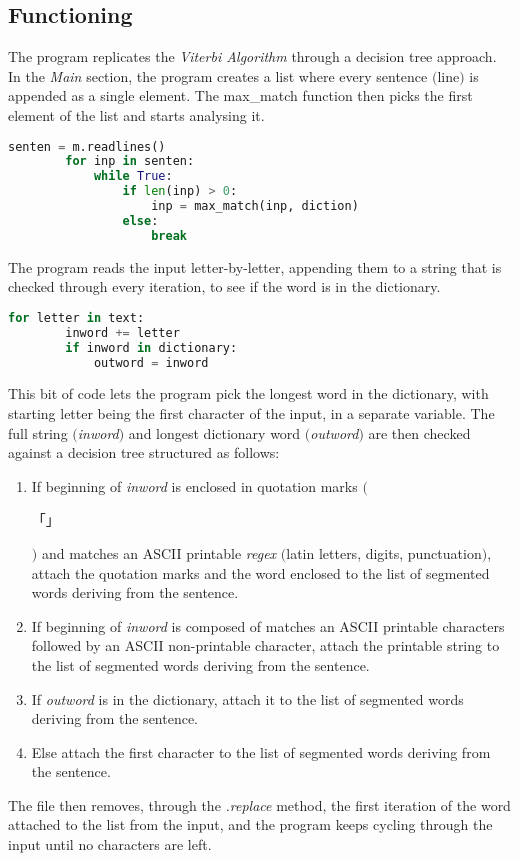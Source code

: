 \documentclass{hitec}
\begin{document}
	\subsection{Functioning}
	The program replicates the \textit{Viterbi Algorithm} through a decision tree approach. In the \textit{Main} section, the program creates a list where every sentence $($line$)$ is appended as a single element. The max\_match function then picks the first element of the list and starts analysing it.
	\begin{lstlisting}[language=python]
	senten = m.readlines()
		for inp in senten:
			while True:
				if len(inp) > 0:
					inp = max_match(inp, diction)
				else:
					break 
	\end{lstlisting} 
	The program reads the input letter-by-letter, appending them to a string that is checked through every iteration, to see if the word is in the dictionary.
	\begin{lstlisting}[language=python]
	for letter in text:
		inword += letter
		if inword in dictionary:
			outword = inword
	\end{lstlisting}
	This bit of code lets the program pick the longest word in the dictionary, with starting letter being the first character of the input, in a separate variable. The full string $($\textit{inword}$)$ and longest dictionary word $($\textit{outword}$)$ are then checked against a decision tree structured as follows:
	\begin{enumerate}
		\item If beginning of \textit{inword} is enclosed in quotation marks $($\begin{CJK}{UTF8}{min}「」\end{CJK}$)$ and matches an ASCII printable \textit{regex} $($latin letters, digits, punctuation$)$, attach the quotation marks and the word enclosed to the list of segmented words deriving from the sentence.
		\item If beginning of \textit{inword} is composed of matches an ASCII printable characters followed by an ASCII non-printable character, attach the printable string to the list of segmented words deriving from the sentence.
		\item If \textit{outword} is in the dictionary, attach it to the list of segmented words deriving from the sentence.
		\item Else attach the first character to the list of segmented words deriving from the sentence.
	\end{enumerate}
	The file then removes, through the \textit{.replace} method, the first iteration of the word attached to the list from the input, and the program keeps cycling through the input until no characters are left. \\
\end{document}
